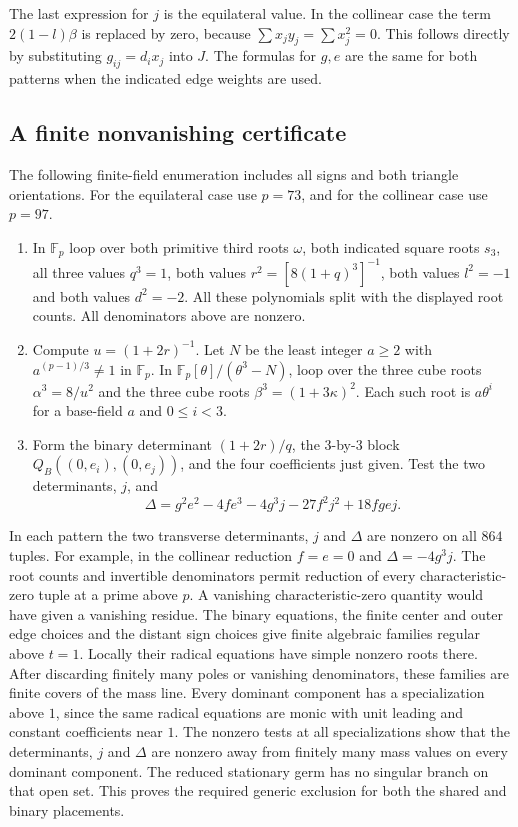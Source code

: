 \documentclass[11pt,letterpaper]{article}
\theoremstyle{definition}
\begin{document}
The last expression for $j$ is the equilateral value. In the collinear
case the term $2(1-l)\beta$ is replaced by zero, because
$\sum x_j y_j=\sum x_j^2=0$. This follows directly by substituting
$g_{ij}=d_i x_j$ into $J$. The formulas for $g,e$ are the same for
both patterns when the indicated edge weights are used.

\subsection{A finite nonvanishing certificate}
The following finite-field enumeration includes all signs and both triangle orientations. For the equilateral case
use $p=73$, and for the collinear case use $p=97$.
\begin{enumerate}
\item In $\mathbb F_p$ loop over both primitive third roots $\omega$,
both indicated square roots $s_3$, all three values $q^3=1$, both
values $r^2=[8(1+q)^3]^{-1}$, both values $l^2=-1$ and both values
$d^2=-2$. All these polynomials split with the displayed root counts.
All denominators above are nonzero.
\item Compute $u=(1+2r)^{-1}$. Let $N$ be the least integer $a\ge2$
with $a^{(p-1)/3}\ne1$ in $\mathbb F_p$. In
$\mathbb F_p[\theta]/(\theta^3-N)$, loop over the three cube roots
$\alpha^3=8/u^2$ and the three cube roots $\beta^3=(1+3\kappa)^2$.
Each such root is $a\theta^i$ for a base-field $a$ and $0\le i<3$.
\item Form the binary determinant $(1+2r)/q$, the $3$-by-$3$ block
$Q_B((0,e_i),(0,e_j))$, and the four coefficients just given. Test the
two determinants, $j$, and
\[
 \Delta=g^2e^2-4fe^3-4g^3j-27f^2j^2+18fgej .
\]
\end{enumerate}
In each pattern the two transverse determinants, $j$ and $\Delta$ are nonzero on all $864$ tuples.
For example, in the collinear reduction $f=e=0$ and $\Delta=-4g^3j$.
The root counts and invertible denominators permit reduction of every
characteristic-zero tuple at a prime above $p$. A vanishing characteristic-zero
quantity would have given a vanishing residue. The binary equations, the
finite center and outer edge choices and the distant sign choices give finite
algebraic families regular above $t=1$. Locally their radical equations have
simple nonzero roots there. After discarding finitely many poles or vanishing
denominators, these families are finite covers of the mass line. Every
dominant component has a specialization above $1$, since the same radical
equations are monic with unit leading and constant coefficients near $1$.
The nonzero tests at all specializations show that the determinants, $j$
and $\Delta$ are nonzero away from finitely many mass values on every
dominant component. The reduced stationary germ has no singular branch on
that open set. This proves the required generic exclusion for both the
shared and binary placements.
\end{document}

